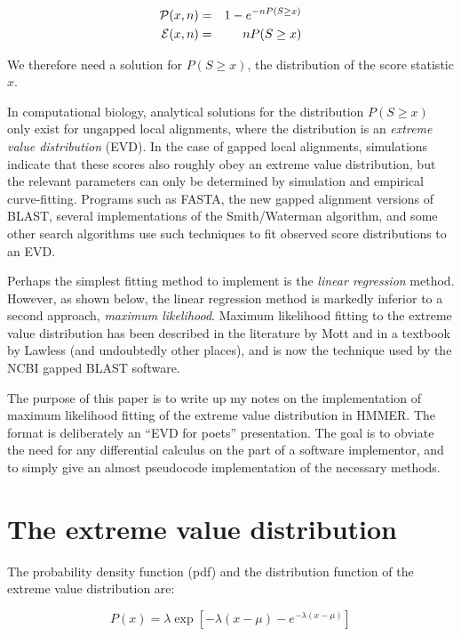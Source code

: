 \begin{eqnarray*}
	{\cal P}(x,n) & = & 1 - e^{-nP(S \geq x)} \\
	{\cal E}(x,n) & = & nP(S \geq x)
\end{eqnarray*}

We therefore need a solution for $P(S \geq x)$, the distribution of
the score statistic $x$.

In computational biology, analytical solutions for the distribution
$P(S \geq x)$ only exist for ungapped local alignments, where the
distribution is an {\em extreme value distribution} (EVD).  In the
case of gapped local alignments, simulations indicate that these
scores also roughly obey an extreme value distribution, but the
relevant parameters can only be determined by simulation and empirical
curve-fitting. Programs such as {\sc FASTA}, the new gapped alignment
versions of {\sc BLAST}, several implementations of the Smith/Waterman
algorithm, and some other search algorithms use such techniques to fit
observed score distributions to an EVD.

Perhaps the simplest fitting method to implement is the {\em linear
regression} method. However, as shown below, the linear regression
method is markedly inferior to a second approach, {\em maximum
likelihood}. Maximum likelihood fitting to the extreme value
distribution has been described in the literature by Mott
\cite{Mott92} and in a textbook by Lawless \cite{Lawless82} (and
undoubtedly other places), and is now the technique used by the NCBI
gapped {\sc BLAST} software. 

The purpose of this paper is to write up my notes on the
implementation of maximum likelihood fitting of the extreme value
distribution in HMMER. The format is deliberately an ``EVD for poets''
presentation. The goal is to obviate the need for any differential
calculus on the part of a software implementor, and to simply give an
almost pseudocode implementation of the necessary methods.

\section{The extreme value distribution}

The probability density function (pdf) and the distribution function
of the extreme value distribution are:

\begin{equation}
P(x) = \lambda \exp \left[ -\lambda (x - \mu) - e^{- \lambda (x - \mu)} \right]
\label{eqn:density}
\end{equation}

